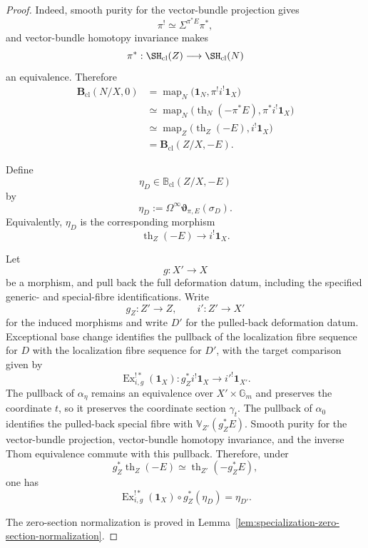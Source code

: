 \begin{proof}
Indeed, smooth purity for the vector-bundle projection gives
\[
    \pi^!
    \simeq
    \Sigma^{\pi^*E}\pi^*,
\]
and vector-bundle homotopy invariance makes
\[
    \pi^*:
    \SH_{\mathrm{cl}}(Z)
    \longrightarrow
    \SH_{\mathrm{cl}}(N)
\]
an equivalence.  Therefore
\[
\begin{aligned}
    \mathbf B_{\mathrm{cl}}(N/X,0)
    &=
    \operatorname{map}_N
    \bigl(
      \mathbf1_N,
      \pi^!i^!\mathbf1_X
    \bigr) \\
    &\simeq
    \operatorname{map}_N
    \bigl(
      \operatorname{th}_N(-\pi^*E),
      \pi^*i^!\mathbf1_X
    \bigr) \\
    &\simeq
    \operatorname{map}_Z
    \bigl(
      \operatorname{th}_Z(-E),
      i^!\mathbf1_X
    \bigr) \\
    &=
    \mathbf B_{\mathrm{cl}}(Z/X,-E).
\end{aligned}
\]

Define
\[
    \eta_D
    \in
    \mathbb B_{\mathrm{cl}}(Z/X,-E)
\]
by
\[
    \eta_D
    :=
    \Omega^\infty
    \boldsymbol{\vartheta}_{\pi,E}
    (\sigma_D).
\]
Equivalently, \(\eta_D\) is the corresponding morphism
\[
    \operatorname{th}_Z(-E)
    \longrightarrow
    i^!\mathbf1_X.
\]

Let
\[
    g:X'\longrightarrow X
\]
be a morphism, and pull back the full deformation datum, including the
specified generic- and special-fibre identifications.  Write
\[
    g_Z:Z'\longrightarrow Z,
    \qquad
    i':Z'\longrightarrow X'
\]
for the induced morphisms and write \(D'\) for the pulled-back deformation
datum.  Exceptional base change identifies the pullback of the localization
fibre sequence for \(D\) with the localization fibre sequence for \(D'\),
with the target comparison given by
\[
    \operatorname{Ex}^{!*}_{i,g}(\mathbf1_X):
    g_Z^*i^!\mathbf1_X
    \longrightarrow
    i'^!\mathbf1_{X'}.
\]
The pullback of \(\alpha_\eta\) remains an equivalence over
\(X'\times\mathbb G_m\) and preserves the coordinate \(t\), so it preserves
the coordinate section \(\gamma_t\).  The pullback of \(\alpha_0\)
identifies the pulled-back special fibre with
\(\mathbb V_{Z'}(g_Z^*E)\).  Smooth purity for the vector-bundle projection,
vector-bundle homotopy invariance, and the inverse Thom equivalence commute
with this pullback.  Therefore, under
\[
    g_Z^*\operatorname{th}_Z(-E)
    \simeq
    \operatorname{th}_{Z'}(-g_Z^*E),
\]
one has
\[
    \operatorname{Ex}^{!*}_{i,g}(\mathbf1_X)
    \circ
    g_Z^*(\eta_D)
    =
    \eta_{D'}.
\]

The zero-section normalization is proved in
Lemma~\ref{lem:specialization-zero-section-normalization}.
\end{proof}


